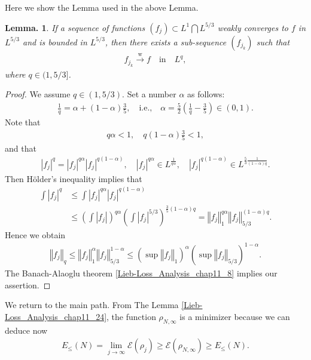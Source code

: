 \documentclass[openany, a4paper, oneside]{jsbook}
\theoremstyle{break}
\newtheorem{lem}[thm]{Lemma.}
\theoremstyle{breakdefn}
\newcommand{\abs}[1]{\left|#1\right|}
\newcommand{\norm}[1]{\left\Vert#1\right\Vert}
\newcommand{\rbk}[1]{\left (#1\right)}
\newcommand{\calE}{\mathcal{E}}
\newcommand{\EleqN}{E_{\leq}(N)}
\newcommand{\limjtoinfty}{\lim_{j \to \infty}}
\newcommand{\rhoNinfty}{\rho_{N, \infty}}
\newcommand{\wto}{\xrightarrow{\text{w}}}
\begin{document}
Here we show the Lemma used in the above Lemma.
\begin{lem}\label{Lieb-Loss_Analysis_chap11_23}
 If a sequence of functions $(f_j) \subset L^{1} \bigcap L^{5/3}$ weakly converges to $f$ in $L^{5/3}$ and is bounded in $L^{5/3}$,
 then there exists a sub-sequence $(f_{j_k})$ such that
 \begin{align}
  f_{j_k} \wto f \quad \mathrm{in} \quad L^q,
 \end{align}
 where $q \in (1, 5/3]$.
\end{lem}
\begin{proof}
We assume $q \in (1, 5/3)$.
Set a number $\alpha$ as follows:
\begin{align}
 \frac{1}{q}
 =
 \alpha + (1 - \alpha) \frac{3}{5}, \quad \text{i.e.,} \quad
 \alpha
 =
 \frac{5}{2} \rbk{\frac{1}{q} - \frac{3}{5}} \in \rbk{0, 1}.
\end{align}
Note that
\begin{align}
 q \alpha < 1, \quad q (1 - \alpha) \frac{3}{5} < 1,
\end{align}
and that
\begin{align}
 \abs{f_j}^{q}
 =
 \abs{f_j}^{q \alpha} \abs{f_j}^{q (1 - \alpha)}, \quad
 \abs{f_j}^{q \alpha} \in L^{\frac{1}{q \alpha}}, \quad
 \abs{f_j}^{q (1 - \alpha)} \in L^{\frac{5}{3} \frac{1}{(1 - \alpha) q}}.
\end{align}
Then H\"older's inequality implies that
\begin{align}
 \int \abs{f_j}^q
 &\leq
 \int \abs{f_j}^{q \alpha} \abs{f_j}^{q (1 - \alpha)} \\
 &\leq
 \rbk{\int \abs{f_j}}^{q \alpha} \rbk{\int \abs{f_j}^{5/3}}^{\frac{3}{5} (1 - \alpha) q}
 =
 \norm{f_j}_{1}^{q \alpha} \norm{f_j}_{5/3}^{(1 - \alpha) q}.
\end{align}
Hence we obtain
\begin{align}
 \norm{f_j}_{q}
 \leq
 \norm{f_j}_{1}^{\alpha} \norm{f_j}_{5/3}^{1 - \alpha}
 \leq
 \rbk{\sup \norm{f_j}_{1}}^{\alpha} \rbk{\sup \norm{f_j}_{5/3}}^{1 - \alpha}.
\end{align}
The Banach-Alaoglu theorem \ref{Lieb-Loss_Analysis_chap11_8} implies our assertion.
\end{proof}

We return to the main path.
From The Lemma \ref{Lieb-Loss_Analysis_chap11_24}, the function $\rhoNinfty$ is a minimizer because we can deduce now
\begin{align}
 \EleqN
 =
 \limjtoinfty \calE (\rho_j)
 \geq
 \calE (\rhoNinfty)
 \geq
 \EleqN.
\end{align}
\end{document}
